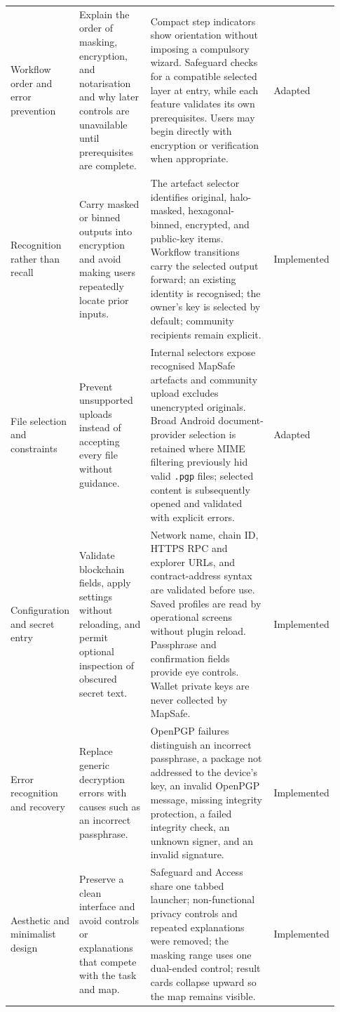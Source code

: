 \documentclass[a4paper,UKenglish,cleveref,autoref,thm-restate]{lipics-v2021}
\begin{document}
{\begin{longtable}{@{}p{0.16\linewidth}p{0.22\linewidth}p{0.40\linewidth}p{0.15\linewidth}@{}}
Workflow order and error prevention & Explain the order of masking, encryption, and notarisation and why later controls are unavailable until prerequisites are complete. & Compact step indicators show orientation without imposing a compulsory wizard. Safeguard checks for a compatible selected layer at entry, while each feature validates its own prerequisites. Users may begin directly with encryption or verification when appropriate. & Adapted \\

Recognition rather than recall & Carry masked or binned outputs into encryption and avoid making users repeatedly locate prior inputs. & The artefact selector identifies original, halo-masked, hexagonal-binned, encrypted, and public-key items. Workflow transitions carry the selected output forward; an existing identity is recognised; the owner's key is selected by default; community recipients remain explicit. & Implemented \\

File selection and constraints & Prevent unsupported uploads instead of accepting every file without guidance. & Internal selectors expose recognised MapSafe artefacts and community upload excludes unencrypted originals. Broad Android document-provider selection is retained where MIME filtering previously hid valid \texttt{.pgp} files; selected content is subsequently opened and validated with explicit errors. & Adapted \\

Configuration and secret entry & Validate blockchain fields, apply settings without reloading, and permit optional inspection of obscured secret text. & Network name, chain ID, HTTPS RPC and explorer URLs, and contract-address syntax are validated before use. Saved profiles are read by operational screens without plugin reload. Passphrase and confirmation fields provide eye controls. Wallet private keys are never collected by MapSafe. & Implemented \\

Error recognition and recovery & Replace generic decryption errors with causes such as an incorrect passphrase. & OpenPGP failures distinguish an incorrect passphrase, a package not addressed to the device's key, an invalid OpenPGP message, missing integrity protection, a failed integrity check, an unknown signer, and an invalid signature. & Implemented \\

Aesthetic and minimalist design & Preserve a clean interface and avoid controls or explanations that compete with the task and map. & Safeguard and Access share one tabbed launcher; non-functional privacy controls and repeated explanations were removed; the masking range uses one dual-ended control; result cards collapse upward so the map remains visible. & Implemented \\


\end{longtable}}
\end{document}
